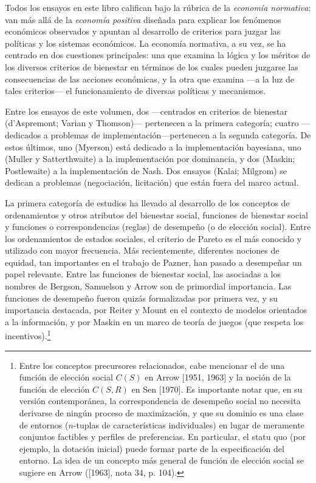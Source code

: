 \documentclass[12pt, letterpaper]{article}
\begin{document}
Todos los ensayos en este libro califican bajo la rúbrica de la \textit{economía normativa}: van más allá de la \textit{economía positiva} diseñada para explicar los fenómenos económicos observados y apuntan al desarrollo de criterios para juzgar las políticas y los sistemas económicos. La economía normativa, a su vez, se ha centrado en dos cuestiones principales: una que examina la lógica y los méritos de los diversos criterios de bienestar en términos de los cuales pueden juzgarse las consecuencias de las acciones económicas, y la otra que examina ---a la luz de tales criterios--- el funcionamiento de diversas políticas y mecanismos.

Entre los ensayos de este volumen, dos ---centrados en criterios de bienestar (d'Aspremont; Varian y Thomson)--- pertenecen a la primera categoría; cuatro ---dedicados a problemas de implementación---pertenecen a la segunda categoría. De estos últimos, uno (Myerson) está dedicado a la implementación bayesiana, uno (Muller y Satterthwaite) a la implementación por dominancia, y dos (Maskin; Postlewaite) a la implementación de Nash. Dos ensayos (Kalai; Milgrom) se dedican a problemas (negociación, licitación) que están fuera del marco actual.

La primera categoría de estudios ha llevado al desarrollo de los conceptos de ordenamientos y otros atributos del bienestar social, funciones de bienestar social y funciones o correspondencias (reglas) de desempeño (o de elección social). Entre los ordenamientos de estados sociales, el criterio de Pareto es el más conocido y utilizado con mayor frecuencia. Más recientemente, diferentes nociones de equidad, tan importantes en el trabajo de Pazner, han pasado a desempeñar un papel relevante. Entre las funciones de bienestar social, las asociadas a los nombres de Bergson, Samuelson y Arrow son de primordial importancia. Las funciones de desempeño fueron quizás formalizadas por primera vez, y su importancia destacada, por Reiter y Mount en el contexto de modelos orientados a la información, y por Maskin en un marco de teoría de juegos (que respeta los incentivos).\footnote{Entre los conceptos precursores relacionados, cabe mencionar el de una función de elección social $C(S)$ en Arrow [1951, 1963] y la noción de la función de elección $C(S, R)$ en Sen [1970]. Es importante notar que, en su versión contemporánea, la correspondencia de desempeño social no necesita derivarse de ningún proceso de maximización, y que su dominio es una clase de entornos ($n$-tuplas de características individuales) en lugar de meramente conjuntos factibles y perfiles de preferencias. En particular, el statu quo (por ejemplo, la dotación inicial) puede formar parte de la especificación del entorno. La idea de un concepto más general de función de elección social se sugiere en Arrow ([1963], nota 34, p. 104).}
\end{document}
